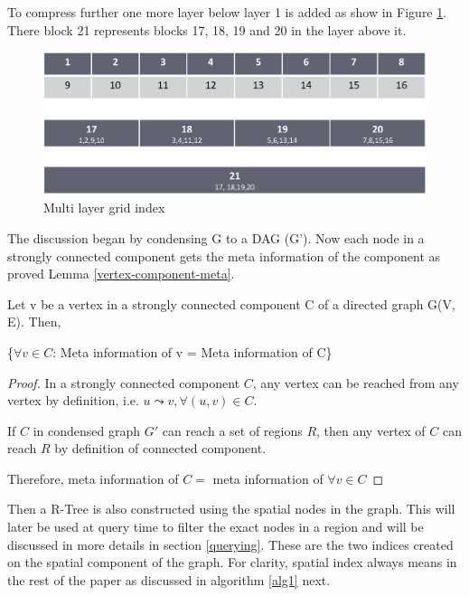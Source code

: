 To compress further one more layer below layer 1 is added as show in Figure \ref{fig:multi-grid2}. There block 21 represents blocks 17, 18, 19 and 20 in the layer above it. 

\begin{figure}[t]
    \centering
    \includegraphics[width=0.88\linewidth]{images/multi_layer_grid_index.eps}
    \caption{Multi layer grid index}
    \label{fig:multi-grid2}
\end{figure}

The discussion began by condensing G to a DAG (G'). Now each node in a strongly connected component gets the meta information of the component as proved Lemma \ref{vertex-component-meta}.

\begin{lemma}
\label{vertex-component-meta}
Let v be a vertex in a strongly connected component C of a directed graph G(V, E). Then,

{\{$\forall v \in C$: Meta information of v = Meta information of C\}}\\
\end{lemma}

\begin{proof}
In a strongly connected component $C$, any vertex can be reached from any vertex by definition, i.e. $u \leadsto v, \forall (u, v) \in C$. 

If $C$ in condensed graph $G'$ can reach a set of regions $R$, then any vertex of $C$ can reach $R$ by definition of connected component.

Therefore, meta information of $C =$ meta information of $\forall v \in C$
\end{proof}

Then a R-Tree is also constructed using the spatial nodes in the graph. This will later be used at query time to filter the exact nodes in a region and will be discussed in more details in section \ref{querying}. These are the two indices created on the spatial component of the graph. For clarity, spatial index always means {\grpspatial} in the rest of the paper as discussed in algorithm \ref{alg1} next.

